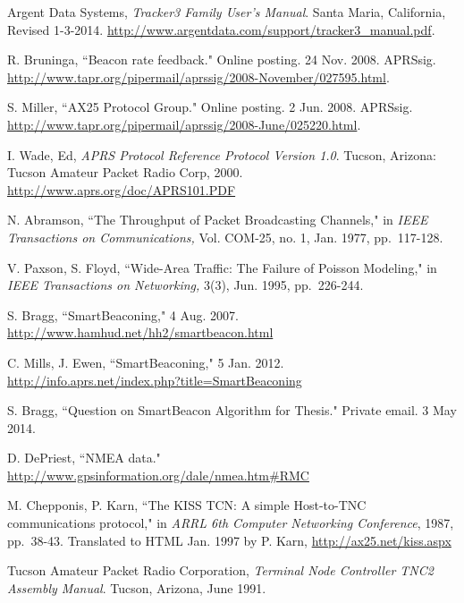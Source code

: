 \begin{thebibliography}{99}


		Argent Data Systems,
		\emph{Tracker3 Family User's Manual}.
		Santa Maria, California,
		Revised 1-3-2014.
		\url{http://www.argentdata.com/support/tracker3_manual.pdf}.

		R. Bruninga,
		``Beacon rate feedback."
		Online posting. 24 Nov. 2008. APRSsig.
		\url{http://www.tapr.org/pipermail/aprssig/2008-November/027595.html}.

		S. Miller,
		``AX25 Protocol Group."
		Online posting. 2 Jun. 2008. APRSsig.
		\url{http://www.tapr.org/pipermail/aprssig/2008-June/025220.html}.

		I. Wade, Ed,
		\emph{APRS Protocol Reference Protocol Version 1.0}.
		Tucson, Arizona: Tucson Amateur Packet Radio Corp, 2000. 
		\url{http://www.aprs.org/doc/APRS101.PDF}

		N. Abramson,
		``The Throughput of Packet Broadcasting Channels," in
		\emph{IEEE Transactions on Communications,}
		Vol. COM-25, no. 1, Jan. 1977, pp.~117-128.

		V. Paxson, S. Floyd,
		``Wide-Area Traffic: The Failure of Poisson Modeling," in
		\emph{IEEE Transactions on Networking,}
		3(3), Jun. 1995, pp.~226-244.

		S. Bragg, 
		``SmartBeaconing\texttrademark,"
		4 Aug. 2007.
		\url{http://www.hamhud.net/hh2/smartbeacon.html}

		C. Mills, J. Ewen,
		``SmartBeaconing,"
		5 Jan. 2012.
		\url{http://info.aprs.net/index.php?title=SmartBeaconing}

		S. Bragg, ``Question on SmartBeacon Algorithm for Thesis."
		Private email. 3 May 2014.

		D. DePriest,
		``NMEA data."
		\url{http://www.gpsinformation.org/dale/nmea.htm#RMC}

		M. Chepponis, P. Karn,
		``The KISS TCN: A simple Host-to-TNC communications protocol,"
		in \emph{ARRL 6th Computer Networking Conference},
		1987, pp.~38-43.
		Translated to HTML Jan. 1997 by P. Karn,
		\url{http://ax25.net/kiss.aspx}

		Tucson Amateur Packet Radio Corporation,
		\emph{Terminal Node Controller TNC2 Assembly Manual}.
		Tucson, Arizona,
		June 1991.

\end{thebibliography}

